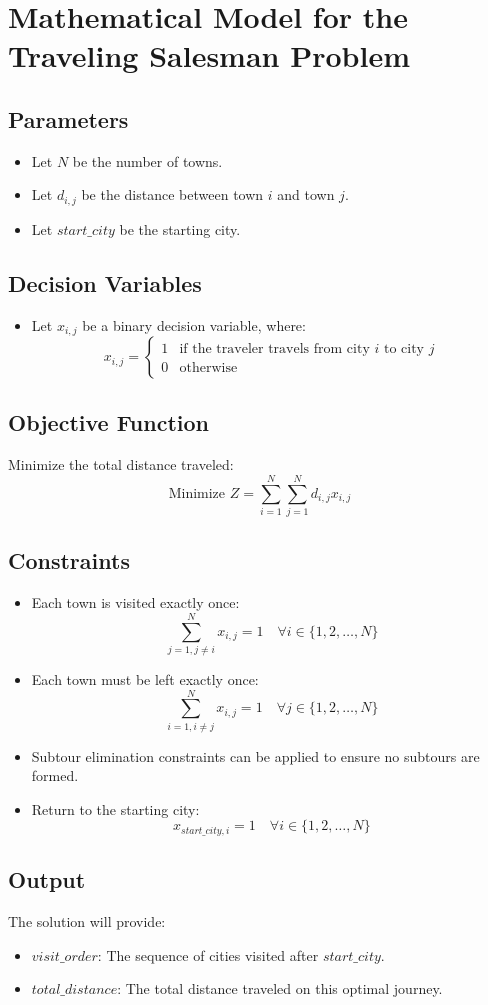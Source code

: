 \documentclass{article}
\begin{document}
\section*{Mathematical Model for the Traveling Salesman Problem}

\subsection*{Parameters}
\begin{itemize}
    \item Let $N$ be the number of towns.
    \item Let $d_{i,j}$ be the distance between town $i$ and town $j$.
    \item Let $start\_city$ be the starting city.
\end{itemize}

\subsection*{Decision Variables}
\begin{itemize}
    \item Let $x_{i,j}$ be a binary decision variable, where:
    \[
    x_{i,j} = 
    \begin{cases} 
    1 & \text{if the traveler travels from city } i \text{ to city } j \\ 
    0 & \text{otherwise} 
    \end{cases}
    \]
\end{itemize}

\subsection*{Objective Function}
Minimize the total distance traveled:
\[
\text{Minimize } Z = \sum_{i=1}^{N} \sum_{j=1}^{N} d_{i,j} x_{i,j}
\]

\subsection*{Constraints}
\begin{itemize}
    \item Each town is visited exactly once:
    \[
    \sum_{j=1, j \neq i}^{N} x_{i,j} = 1 \quad \forall i \in \{1, 2, \ldots, N\}
    \]
    
    \item Each town must be left exactly once:
    \[
    \sum_{i=1, i \neq j}^{N} x_{i,j} = 1 \quad \forall j \in \{1, 2, \ldots, N\}
    \]

    \item Subtour elimination constraints can be applied to ensure no subtours are formed.

    \item Return to the starting city:
    \[
    x_{start\_city,i} = 1 \quad \forall i \in \{1, 2, \ldots, N\}
    \]
\end{itemize}

\subsection*{Output}
The solution will provide:
\begin{itemize}
    \item $visit\_order$: The sequence of cities visited after $start\_city$.
    \item $total\_distance$: The total distance traveled on this optimal journey.
\end{itemize}
\end{document}
